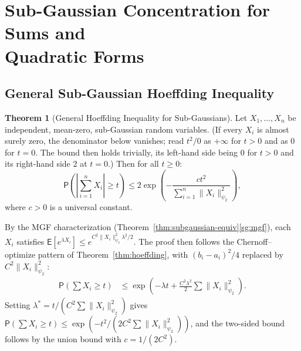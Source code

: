 \documentclass[12pt,a4paper]{article}
\makeatletter
\theoremstyle{definition}
\newtheorem{theorem}{Theorem}[section]
\renewenvironment{proof}[1][\proofname]{\par
  \pushQED{\qed}%
  \normalfont \topsep6\p@\@plus6\p@\relax
  \trivlist
  \item[\hskip\labelsep\bfseries #1\@addpunct{.}]\ignorespaces
}{%
  \popQED\endtrivlist\@endpefalse
}
\newcommand\expc{\mathsf{E}}
\newcommand\prb{\mathsf{P}}
\makeatother
\begin{document}
\section[Sub-Gaussian Concentration for Sums and Quadratic Forms]{Sub-Gaussian Concentration for Sums and\\ Quadratic Forms}\label{sec:sg-conc}

\subsection{General Sub-Gaussian Hoeffding Inequality}

\begin{theorem}[General Hoeffding Inequality for Sub-Gaussians]\label{thm:hoeffding-sg}
Let $X_1, \ldots, X_n$ be independent, mean-zero, sub-Gaussian random variables. (If every $X_i$ is almost surely zero, the denominator below vanishes; read $t^2/0$ as $+\infty$ for $t > 0$ and as $0$ for $t = 0$. The bound then holds trivially, its left-hand side being $0$ for $t > 0$ and its right-hand side $2$ at $t = 0$.) Then for all $t \geqslant 0$:
\begin{equation}\label{eq:hoeffding-sg}
\prb\!\left(\left|\sum_{i=1}^n X_i\right| \geqslant t\right) \leqslant 2\exp\!\left(-\frac{ct^2}{\sum_{i=1}^n \|X_i\|_{\psi_2}^2}\right),
\end{equation}
where $c > 0$ is a universal constant.
\end{theorem}

\begin{proof}
By the MGF characterization (Theorem~\ref{thm:subgaussian-equiv}\ref{sg:mgf}), each $X_i$ satisfies $\expc[e^{\lambda X_i}] \leqslant e^{C^2\|X_i\|_{\psi_2}^2\lambda^2/2}$. The proof then follows the Chernoff--optimize pattern of Theorem~\ref{thm:hoeffding}, with $(b_i - a_i)^2/4$ replaced by $C^2\|X_i\|_{\psi_2}^2$:
\begin{align*}
\prb\!\left(\sum X_i \geqslant t\right) &\leqslant \exp\!\left(-\lambda t + \frac{C^2\lambda^2}{2}\sum \|X_i\|_{\psi_2}^2\right).
\end{align*}
Setting $\lambda^* = t/(C^2\sum\|X_i\|_{\psi_2}^2)$ gives $\prb(\sum X_i \geqslant t) \leqslant \exp(-t^2/(2C^2\sum\|X_i\|_{\psi_2}^2))$, and the two-sided bound follows by the union bound with $c = 1/(2C^2)$.
\end{proof}
\end{document}
